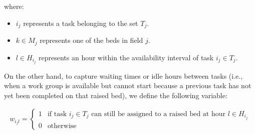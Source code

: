 where:
\begin{itemize}
    \item $i_j$ represents a task belonging to the set $T_j$.
    \item $k \in M_j$ represents one of the beds in field $j$.
    \item $l \in H_{i_j}$ represents an hour within the availability interval of task $i_j \in T_j$.
\end{itemize}


On the other hand, to capture waiting times or idle hours between tasks  
(i.e., when a work group is available but cannot start because a previous task has not yet been completed on that raised bed), we define the following variable:

\[
\begin{aligned}
    w_{i_j l} = 
    \begin{cases} 
        1 & \text{if task } i_j \in T_j \text{ can still be assigned to a raised bed at hour } l \in H_{i_j} \\
        0 & \text{otherwise}
    \end{cases}
\end{aligned}
\]


